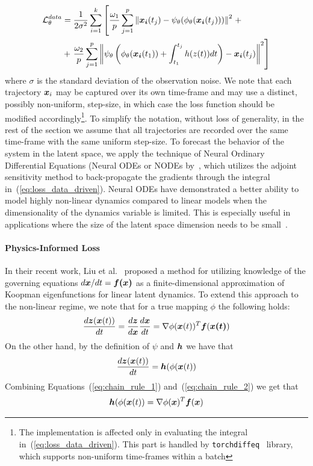 \begin{align}
    \label{eq:loss_data_driven}
    \operatorname{\mathcal{L}}^{data}_\theta & = \frac{1}{2\sigma^2}\sum_{i = 1}^k \left[\frac{\omega_1}{p}\sum_{j=1}^p\left\|\boldsymbol{x_i}(t_j) - \psi_\theta(\phi_\theta(\boldsymbol{x_i}(t_j)))\right\|^2\right. + \\
     & + \left.\frac{\omega_2}{p}\sum_{j=1}^p \left\|\psi_\theta\left(\phi_\theta(\boldsymbol{x_i}(t_1)) + \int_{t_1}^{t_j}h(z(t))dt\right) - \boldsymbol{x_i}(t_j)\right\|^2 \right]
\end{align}
where $\sigma$ is the standard deviation of the observation noise. We note that each trajectory $\boldsymbol{x}_i$ may be captured over its own time-frame and may use a distinct, possibly non-uniform, step-size, in which case the loss function should be modified accordingly\footnote{The implementation is affected only in evaluating the integral in~(\ref{eq:loss_data_driven}). This part is handled by \texttt{torchdiffeq}~\citep{chen2018neural} library, which supports non-uniform time-frames within a batch}. To simplify the notation, without loss of generality, in the rest of the section we assume that all trajectories are recorded over the same time-frame with the same uniform step-size. To forecast the behavior of the system in the latent space, we apply the technique of Neural Ordinary Differential Equations (Neural ODEs or NODEs by~\citep{chen2018neuralode}, which utilizes the adjoint sensitivity method to back-propagate the gradients through the integral in~(\ref{eq:loss_data_driven}). Neural ODEs have demonstrated a better ability to model highly non-linear dynamics compared to linear models when the dimensionality of the dynamics variable is limited. This is especially useful in applications where the size of the latent space dimension needs to be small~\citep{lee2020model,gin2021deep,champion2019data,kim2019deep}.

\paragraph{Physics-Informed Loss} In their recent work, Liu et al.~\citep{liu2022physics} proposed a method for utilizing knowledge of the governing equations $d\boldsymbol{x}/dt = \boldsymbol{f(x)}$ as a finite-dimensional approximation of Koopman eigenfunctions for linear latent dynamics. To extend this approach to the non-linear regime, we note that for a true mapping $\phi$ the following holds:
\begin{equation}
    \label{eq:chain_rule_1}
    \frac{d\boldsymbol{z}(\boldsymbol{x}(t))}{dt} = \frac{d\boldsymbol{z}}{d\boldsymbol{x}}\frac{d\boldsymbol{x}}{dt} = \nabla\phi(\boldsymbol{x}(t))^T\boldsymbol{f}(\boldsymbol{x(t)})
\end{equation}
On the other hand, by the definition of $\psi$ and $\boldsymbol{h}$ we have that
\begin{equation}
    \label{eq:chain_rule_2}
    \frac{d\boldsymbol{z}(\boldsymbol{x}(t))}{dt} = \boldsymbol{h}(\phi(\boldsymbol{x}(t))
\end{equation}
Combining Equations~(\ref{eq:chain_rule_1}) and~(\ref{eq:chain_rule_2}) we get that
\begin{equation}
    \label{eq:physsics_informed_equation}
    \boldsymbol{h}(\phi(\boldsymbol{x}(t)) = \nabla\phi(\boldsymbol{x})^T\boldsymbol{f}(\boldsymbol{x})
\end{equation}

